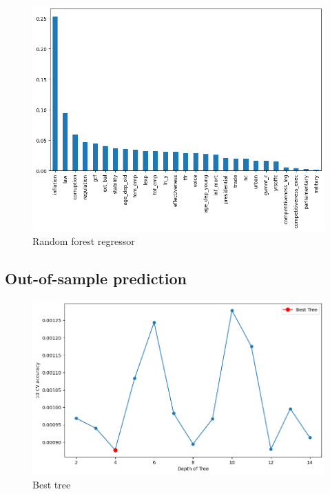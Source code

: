 \documentclass[10pt,leqno]{article}
\begin{document}
\begin{figure}  [h!]
\begin{center}
\caption{Random forest regressor}
\includegraphics[scale=0.4]{RFRegressor_RF1.png}
\end{center}
\end{figure}  

\pagebreak
\subsection{Out-of-sample prediction}
\begin{figure}  [h!]
\begin{center}
\caption{Best tree}
\includegraphics[scale=0.4]{BestTree_RF2.png}
\end{center}
\end{figure}  
\end{document}
